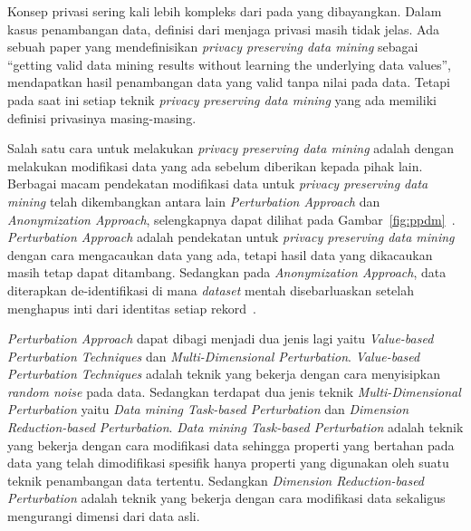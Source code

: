 Konsep privasi sering kali lebih kompleks dari pada yang dibayangkan. Dalam kasus penambangan data, definisi dari menjaga privasi masih tidak jelas. Ada sebuah paper yang mendefinisikan \textit{privacy preserving data mining} sebagai “getting valid data mining results without learning the underlying data values”, mendapatkan hasil penambangan data yang valid tanpa  nilai pada data. Tetapi pada saat ini setiap teknik \textit{privacy preserving data mining} yang ada memiliki definisi privasinya masing-masing. 

Salah satu cara untuk melakukan \textit{privacy preserving data mining} adalah dengan melakukan modifikasi data yang ada sebelum diberikan kepada pihak lain. Berbagai macam pendekatan modifikasi data untuk \textit{privacy preserving data mining} telah dikembangkan antara lain \textit{Perturbation Approach} dan \textit{Anonymization Approach}, selengkapnya dapat dilihat pada Gambar~\ref{fig:ppdm}~\cite{rezaseifi:11:ppdm}. \textit{Perturbation Approach} adalah pendekatan untuk \textit{privacy preserving data mining} dengan cara mengacaukan data yang ada, tetapi hasil data yang dikacaukan masih tetap dapat ditambang. Sedangkan pada \textit{Anonymization Approach}, data diterapkan de-identifikasi di mana \textit{dataset} mentah disebarluaskan setelah menghapus inti dari identitas setiap rekord~\cite{rezaseifi:11:ppdm}.

\textit{Perturbation Approach} dapat dibagi menjadi dua jenis lagi yaitu \textit{Value-based Perturbation Techniques} dan \textit{Multi-Dimensional Perturbation}. \textit{Value-based Perturbation Techniques} adalah teknik yang bekerja dengan cara menyisipkan \textit{random noise} pada data. Sedangkan terdapat dua jenis teknik \textit{Multi-Dimensional Perturbation} yaitu \textit{Data mining Task-based Perturbation} dan \textit{Dimension Reduction-based Perturbation}. \textit{Data mining Task-based Perturbation} adalah teknik yang bekerja dengan cara modifikasi data sehingga properti yang bertahan pada data yang telah dimodifikasi spesifik hanya properti yang digunakan oleh suatu teknik penambangan data tertentu. Sedangkan \textit{Dimension Reduction-based Perturbation} adalah teknik yang bekerja dengan cara modifikasi data sekaligus mengurangi dimensi dari data asli.


